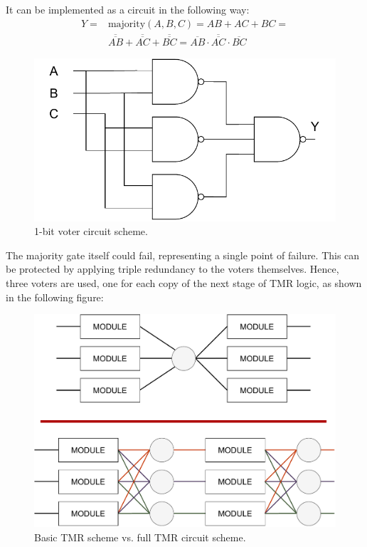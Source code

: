 It can be implemented as a circuit in the following way:
\begin{equation}
\begin{aligned}
Y ={} & \text{majority}(A, B, C) = AB + AC + BC = \\
      & \overline{\overline{AB}} + \overline{\overline{AC}} + \overline{\overline{BC}} = \overline{\overline{AB}\cdot\overline{AC}\cdot\overline{BC}}
\end{aligned}
\end{equation}

\begin{figure}[H]
\centering
\includegraphics[width=0.7\linewidth]{images/chapter4/tmr_circuit.pdf}
\caption{1-bit voter circuit scheme.}
\label{fig:voter_scheme}
\end{figure}

The majority gate itself could fail, representing a single point of failure. This can be protected by applying triple redundancy to the voters themselves. Hence, three voters are used, one for each copy of the next stage of TMR logic, as shown in the following figure:

\begin{figure}[H]
\centering
\includegraphics[width=0.9\linewidth]{images/chapter4/tmr_voter.pdf}
\caption{Basic TMR scheme vs. full TMR circuit scheme.}
\end{figure}

